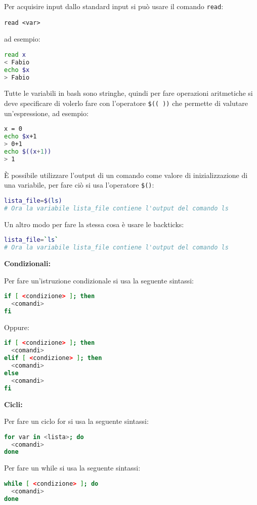 \documentclass[a4paper]{article}
\begin{document}
\vspace{1em}
\noindent
Per acquisire input dallo standard input si può usare il comando \texttt{read}:
\begin{lstlisting}
read <var>
\end{lstlisting}
ad esempio:
\begin{lstlisting}[language=bash]
read x
< Fabio
echo $x
> Fabio
\end{lstlisting}

\vspace{1em}
\noindent
Tutte le variabili in bash sono stringhe, quindi per fare operazioni aritmetiche si
deve specificare di volerlo fare con l'operatore \texttt{\$(( ))} che permette di 
valutare un'espressione, ad esempio:
\begin{lstlisting}[language=bash]
x = 0
echo $x+1
> 0+1
echo $((x+1))
> 1
\end{lstlisting}


\vspace{1em}
\noindent
È possibile utilizzare l'output di un comando come valore di inizializzazione di una
variabile, per fare ciò si usa l'operatore \texttt{\$()}:
\begin{lstlisting}[language=bash]
lista_file=$(ls)
# Ora la variabile lista_file contiene l'output del comando ls
\end{lstlisting}
Un altro modo per fare la stessa cosa è usare le backticks:
\begin{lstlisting}[language=bash]
lista_file=`ls`
# Ora la variabile lista_file contiene l'output del comando ls
\end{lstlisting}

\vspace{1em}
\noindent
\textbf{Condizionali:}

\noindent
Per fare un'istruzione condizionale si usa la seguente sintassi:
\begin{lstlisting}[language=bash]
if [ <condizione> ]; then
  <comandi>
fi
\end{lstlisting}
Oppure:
\begin{lstlisting}[language=bash]
if [ <condizione> ]; then
  <comandi>
elif [ <condizione> ]; then
  <comandi>
else
  <comandi>
fi
\end{lstlisting}

\vspace{1em}
\noindent
\textbf{Cicli:}

\noindent
Per fare un ciclo for si usa la seguente sintassi:
\begin{lstlisting}[language=bash]
for var in <lista>; do
  <comandi>
done
\end{lstlisting}
Per fare un while si usa la seguente sintassi:
\begin{lstlisting}[language=bash]
while [ <condizione> ]; do
  <comandi>
done
\end{lstlisting}
\end{document}

